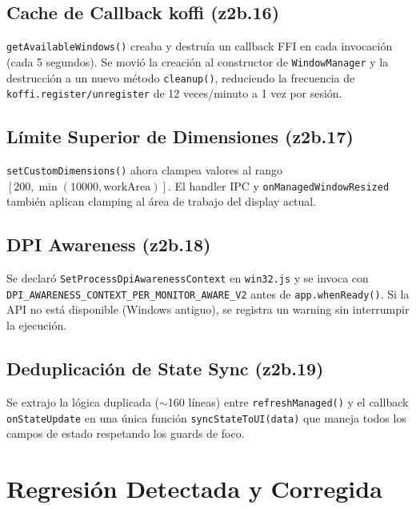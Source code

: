 \documentclass[12pt,a4paper]{article}
\begin{document}
\subsection{Cache de Callback koffi (z2b.16)}
\texttt{getAvailableWindows()} creaba y destru\'ia un callback FFI en cada invocaci\'on (cada 5 segundos). Se movi\'o la creaci\'on al constructor de \texttt{WindowManager} y la destrucci\'on a un nuevo m\'etodo \texttt{cleanup()}, reduciendo la frecuencia de \texttt{koffi.register/unregister} de 12 veces/minuto a 1 vez por sesi\'on.

\subsection{L\'imite Superior de Dimensiones (z2b.17)}
\texttt{setCustomDimensions()} ahora clampea valores al rango $[200, \min(10000, \text{workArea})]$. El handler IPC y \texttt{onManagedWindowResized} tambi\'en aplican clamping al \'area de trabajo del display actual.

\subsection{DPI Awareness (z2b.18)}
Se declar\'o \texttt{SetProcessDpiAwarenessContext} en \texttt{win32.js} y se invoca con \texttt{DPI\_AWARENESS\_CONTEXT\_PER\_MONITOR\_AWARE\_V2} antes de \texttt{app.whenReady()}. Si la API no est\'a disponible (Windows antiguo), se registra un warning sin interrumpir la ejecuci\'on.

\subsection{Deduplicaci\'on de State Sync (z2b.19)}
Se extrajo la l\'ogica duplicada ($\sim$160 l\'ineas) entre \texttt{refreshManaged()} y el callback \texttt{onStateUpdate} en una \'unica funci\'on \texttt{syncStateToUI(data)} que maneja todos los campos de estado respetando los guards de foco.

\section{Regresi\'on Detectada y Corregida}
\end{document}
